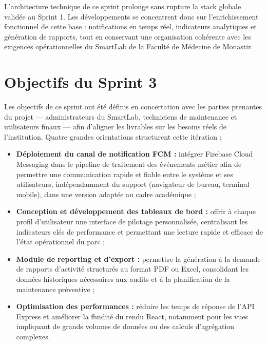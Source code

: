 L'architecture technique de ce sprint prolonge sans rupture la stack globale validée au Sprint 1. Les développements se concentrent donc sur l'enrichissement fonctionnel de cette base : notifications en temps réel, indicateurs analytiques et génération de rapports, tout en conservant une organisation cohérente avec les exigences opérationnelles du SmartLab de la Faculté de Médecine de Monastir.

\section{Objectifs du Sprint 3}
\label{sec:objectifs_sprint3}

Les objectifs de ce sprint ont été définis en concertation avec les parties prenantes du projet — administrateurs du SmartLab, techniciens de maintenance et utilisateurs finaux — afin d'aligner les livrables sur les besoins réels de l'institution. Quatre grandes orientations structurent cette itération :

\begin{itemize}
    \item \textbf{Déploiement du canal de notification FCM :} intégrer Firebase Cloud Messaging dans le pipeline de traitement des événements métier afin de permettre une communication rapide et fiable entre le système et ses utilisateurs, indépendamment du support (navigateur de bureau, terminal mobile), dans une version adaptée au cadre académique ;

    \item \textbf{Conception et développement des tableaux de bord :} offrir à chaque profil d'utilisateur une interface de pilotage personnalisée, centralisant les indicateurs clés de performance et permettant une lecture rapide et efficace de l'état opérationnel du parc ;

    \item \textbf{Module de reporting et d'export :} permettre la génération à la demande de rapports d'activité structurés au format PDF ou Excel, consolidant les données historiques nécessaires aux audits et à la planification de la maintenance préventive ;

    \item \textbf{Optimisation des performances :} réduire les temps de réponse de l'API Express et améliorer la fluidité du rendu React, notamment pour les vues impliquant de grands volumes de données ou des calculs d'agrégation complexes.
\end{itemize}

